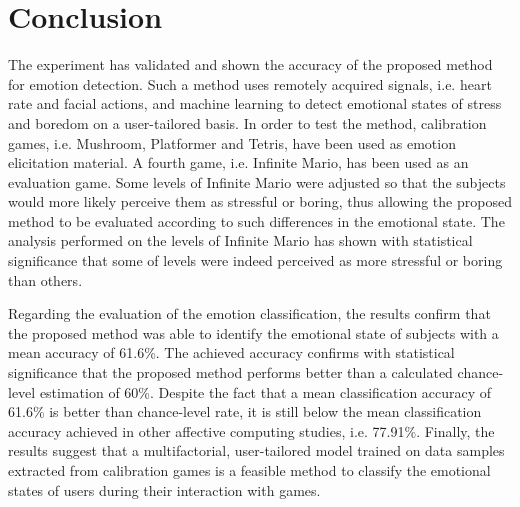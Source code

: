 


\section{Conclusion}

The experiment has validated and shown the accuracy of the proposed method for emotion detection. Such a method uses remotely acquired signals, i.e. heart rate and facial actions, and machine learning to detect emotional states of stress and boredom on a user-tailored basis. In order to test the method, calibration games, i.e. Mushroom, Platformer and Tetris, have been used as emotion elicitation material. A fourth game, i.e. Infinite Mario, has been used as an evaluation game. Some levels of Infinite Mario were adjusted so that the subjects would more likely perceive them as stressful or boring, thus allowing the proposed method to be evaluated according to such differences in the emotional state. The analysis performed on the levels of Infinite Mario has shown with statistical significance that some of levels were indeed perceived as more stressful or boring than others.

Regarding the evaluation of the emotion classification, the results confirm that the proposed method was able to identify the emotional state of subjects with a mean accuracy of 61.6\%. The achieved accuracy confirms with statistical significance that the proposed method performs better than a calculated chance-level estimation of 60\%. Despite the fact that a mean classification accuracy of 61.6\% is better than chance-level rate, it is still below the mean classification accuracy achieved in other affective computing studies, i.e. 77.91\%.
Finally, the results suggest that a multifactorial, user-tailored model trained on data samples extracted from calibration games is a feasible method to classify the emotional states of users during their interaction with games.

